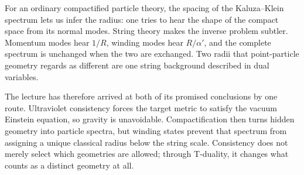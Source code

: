 For an ordinary compactified particle theory, the spacing of the
Kaluza--Klein spectrum lets us infer the radius: one tries to hear the shape
of the compact space from its normal modes.  String theory makes the inverse
problem subtler.  Momentum modes hear \(1/R\), winding modes hear
\(R/\alpha'\), and the complete spectrum is unchanged when the two are
exchanged.  Two radii that point-particle geometry regards as different are
one string background described in dual variables.

The lecture has therefore arrived at both of its promised conclusions by
one route.  Ultraviolet consistency forces the target metric to satisfy the
vacuum Einstein equation, so gravity is unavoidable.  Compactification then
turns hidden geometry into particle spectra, but winding states prevent that
spectrum from assigning a unique classical radius below the string scale.
Consistency does not merely select which geometries are allowed; through
T-duality, it changes what counts as a distinct geometry at all.
